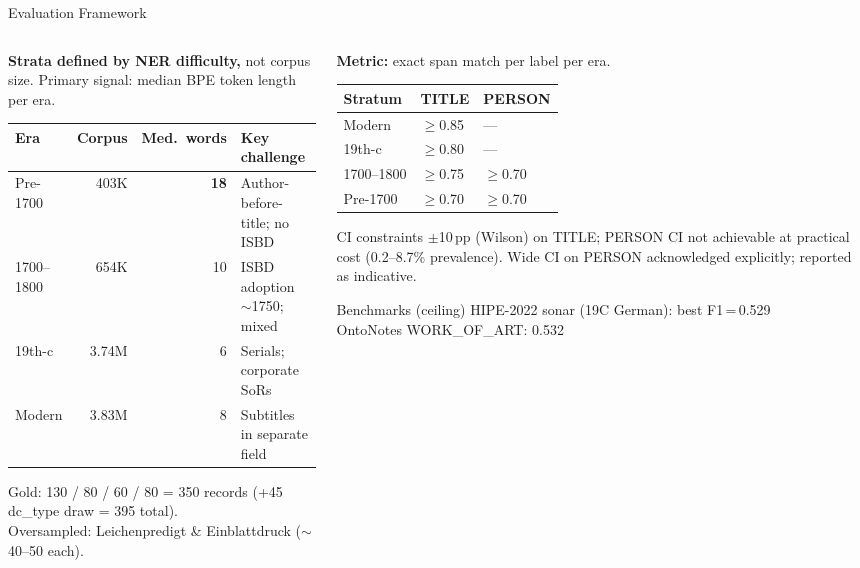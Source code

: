 \documentclass[xcolor,aspectratio=169,compress]{beamer}
\begin{document}

\begin{frame}{Evaluation Framework}
  \small
  \begin{columns}
    \begin{column}{.52\textwidth}
      \textbf{Strata defined by NER difficulty,} not corpus size.
      Primary signal: median BPE token length per era.
      \medskip

      \footnotesize
      \begin{tabular}{lrrl}
        \toprule
        Era & Corpus & Med.\ words & Key challenge \\
        \midrule
        Pre-1700   & 403K  & \textbf{18} & Author-before-title; no ISBD \\
        1700--1800 & 654K  & 10          & ISBD adoption $\sim$1750; mixed \\
        19th-c     & 3.74M &  6          & Serials; corporate SoRs \\
        Modern     & 3.83M &  8          & Subtitles in separate field \\
        \bottomrule
      \end{tabular}
      \smallskip\small

      Gold: 130 / 80 / 60 / 80 = 350 records (+45 dc\_type draw = 395 total).\\
      Oversampled: Leichenpredigt \& Einblattdruck ($\sim$40--50 each).
    \end{column}
    \begin{column}{.45\textwidth}
      \textbf{Metric:} exact span match per label per era.
      \smallskip
      \begin{tabular}{lll}
        \toprule
        Stratum & TITLE & PERSON \\
        \midrule
        Modern   & $\geq$0.85 & --- \\
        19th-c   & $\geq$0.80 & --- \\
        1700--1800 & $\geq$0.75 & $\geq$0.70 \\
        Pre-1700   & $\geq$0.70 & $\geq$0.70 \\
        \bottomrule
      \end{tabular}
      \smallskip

      \begin{block}{CI constraints}
        \footnotesize
        $\pm$10\,pp (Wilson) on TITLE; PERSON CI not
        achievable at practical cost (0.2--8.7\%
        prevalence). Wide CI on PERSON acknowledged
        explicitly; reported as indicative.
      \end{block}

      \begin{alertblock}{Benchmarks (ceiling)}
        \footnotesize
        HIPE-2022 sonar (19C German): best F1\,=\,0.529\\
        OntoNotes WORK\_OF\_ART: 0.532
      \end{alertblock}
    \end{column}
  \end{columns}
\end{frame}
\end{document}
